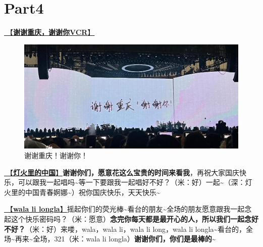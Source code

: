 \documentclass[]{ctexbook}
\begin{document}
\section{Part4}\label{chongqing-20241007-part4}

\hyperref[thank-you-vcr]{🎥【\textbf{谢谢重庆，谢谢你VCR}】}

\begin{figure}

{\centering \includegraphics[width=400pt]{img/chongqing20241007/thank-chongqing} 

}

\caption{谢谢重庆！谢谢你！}\label{fig:unnamed-chunk-119}
\end{figure}

\hyperref[China-in-the-light]{🎵【\textbf{灯火里的中国}】}\textbf{谢谢你们，愿意花这么宝贵的时间来看我}，再祝大家国庆快乐，可以跟我一起唱吗\textasciitilde 等一下要跟我一起唱好不好？（米：好）一起\textasciitilde（深：灯火里的中国青春婀娜\textasciitilde）祝你国庆快乐，天天快乐\textasciitilde{}

\hyperref[wala-li-longla]{🎵【\textbf{wala li longla}】}摇起你们的荧光棒\textasciitilde 看台的朋友\textasciitilde 全场的朋友愿意跟我一起念起这个快乐密码吗？（米：愿意）\textbf{念完你每天都是最开心的人，所以我们一起念好不好？}（米：好）来喽，wala，wala li，wala li long，wala li longla\textasciitilde 看台的，全场\textasciitilde 再来\textasciitilde 全场，321（米：wala li longla）\textbf{谢谢你们，你们是最棒的\textasciitilde{}}
\end{document}
